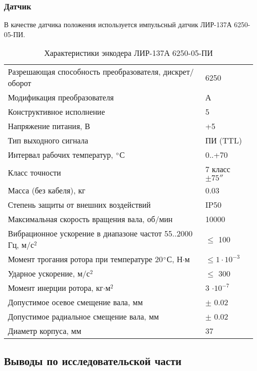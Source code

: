 \subsubsection{Датчик}
В качестве датчика положения используется импульсный датчик ЛИР-137А 6250-05-ПИ.

\begin{table}[ht]
    \centering
    \begin{tabular}{l|l}
    \hline
        Разрешающая способность преобразователя, дискрет/оборот         & 6250 \\
        Модификация преобразователя                                     & А \\
        Конструктивное исполнение                                       & 5 \\
        Напряжение питания, В                                           & +5 \\
        Тип выходного сигнала                                           & ПИ (TTL) \\
        Интервал рабочих температур, $\degree$С                         & 0..+70 \\
        Класс точности                                                  & 7 класс $\pm75''$ \\
        Масса (без кабеля), кг                                          & 0.03 \\
        Степень защиты от внешних воздействий                           & IP50 \\
        Максимальная скорость вращения вала, об/мин                     & 10000 \\
        Вибрационное ускорение в диапазоне частот 55..2000 Гц, м/с$^2$  & $\leq$ 100 \\
        Момент трогания ротора при температуре 20$\degree$С, Н$\cdot$м  & $\leq 1 \cdot 10^{-3}$ \\
        Ударное ускорение, м/с$^2$                                      & $\leq$ 300 \\
        Момент инерции ротора, кг$\cdot$м$^2$                           & 3 $\cdot 10^{-7}$ \\
        Допустимое осевое смещение вала, мм                             & $\pm$ 0.02 \\
        Допустимое радиальное смещение вала, мм                         & $\pm$ 0.02 \\
        Диаметр корпуса, мм                                             & 37 \\
    \hline
    \end{tabular}
    \caption{Характеристики энкодера ЛИР-137А 6250-05-ПИ}
    \label{encoder_params}
\end{table}

\newpage


\newpage


\newpage
\subsection{Выводы по исследовательской части}
